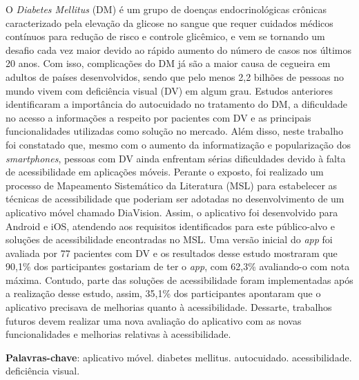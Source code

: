 \setlength{\absparsep}{18pt} %
\begin{resumo}
    O \emph{Diabetes Mellitus} (DM) é um grupo de doenças endocrinológicas crônicas caracterizado pela elevação
    da glicose no sangue que requer cuidados médicos contínuos para redução de risco e controle glicêmico, e vem se
    tornando um desafio cada vez maior devido ao rápido aumento do número de casos nos últimos 20 anos. Com isso,
    complicações do DM já são a maior causa de cegueira em adultos de países desenvolvidos, sendo que pelo menos 2,2
    bilhões de pessoas no mundo vivem com deficiência visual (DV) em algum grau.
    Estudos anteriores identificaram a importância do autocuidado no tratamento do DM, a dificuldade
    no acesso a informações a respeito por pacientes com DV e as principais funcionalidades utilizadas
    como solução no mercado. Além disso, neste trabalho foi constatado que, mesmo com o aumento da informatização e
    popularização dos \emph{smartphones}, pessoas com DV ainda enfrentam sérias dificuldades devido à falta
    de acessibilidade em aplicações móveis. Perante o exposto, foi realizado um processo de Mapeamento Sistemático da
    Literatura (MSL) para estabelecer as técnicas de acessibilidade que poderiam ser adotadas no desenvolvimento
    de um aplicativo móvel chamado DiaVision. Assim, o aplicativo foi desenvolvido para Android e iOS, atendendo
    aos requisitos identificados para este público-alvo e soluções de acessibilidade encontradas no MSL\@.
    Uma versão inicial do \emph{app} foi avaliada por 77 pacientes com DV e os resultados desse estudo
    mostraram que 90,1\% dos participantes gostariam de ter o \emph{app}, com 62,3\% avaliando-o com nota máxima.
    Contudo, parte das soluções de acessibilidade foram implementadas após a realização desse estudo, assim,
    35,1\% dos participantes apontaram que o aplicativo precisava de melhorias quanto à acessibilidade. Dessarte,
    trabalhos futuros devem realizar uma nova avaliação do aplicativo com as novas funcionalidades e melhorias
    relativas à acessibilidade.

    \textbf{Palavras-chave}: aplicativo móvel. diabetes mellitus. autocuidado. acessibilidade. deficiência visual.
\end{resumo}